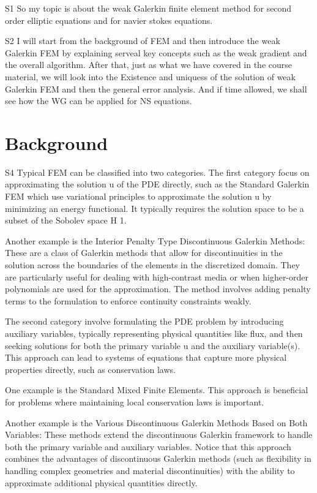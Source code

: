\documentclass[17pt]{extarticle} %
\begin{document}
\setlength{\parskip}{1em} 
\setlength{\parindent}{0pt}
S1
So my topic is about the weak Galerkin finite element method for second order elliptic
equations and for navier stokes equations.

S2
I will start from the background of FEM and then introduce the weak Galerkin FEM by explaining 
serveal key concepts such as the weak gradient and the overall algorithm. After that, just as what we have 
covered in the course material, we will look into the Existence and uniquess of the solution of weak
Galerkin FEM and then the general error analysis. And if time allowed, we shall see how the WG can be 
applied for NS equations.

\section*{Background}
S4
Typical FEM can be classified into two categories. The first category focus on approximating the 
solution u of the PDE directly, such as the Standard Galerkin FEM which 
use variational principles to approximate the solution u by minimizing an energy functional.
It typically requires the solution space to be a subset of the Sobolev space H 1.

Another example is the Interior Penalty Type Discontinuous Galerkin Methods: These are a class of Galerkin methods that allow 
for discontinuities in the solution across the boundaries of the elements in the discretized domain. 
They are particularly useful for dealing with high-contrast media or when higher-order polynomials 
are used for the approximation. The method involves adding penalty terms to the formulation to 
enforce continuity constraints weakly.

The second category involve formulating the PDE problem by introducing auxiliary variables, 
typically representing physical quantities like flux, and then seeking solutions for
both the primary variable u and the auxiliary variable(s). This approach can lead to 
systems of equations that capture more physical properties directly, such as conservation 
laws.

One example is the Standard Mixed Finite Elements. This approach 
is beneficial for problems where maintaining local conservation laws is important. 

Another example is the Various Discontinuous Galerkin Methods Based on Both Variables: These methods extend 
the discontinuous Galerkin framework to handle both the primary variable and auxiliary 
variables. Notice that this approach combines the advantages of discontinuous Galerkin 
methods (such as flexibility in handling complex geometries and material discontinuities) 
with the ability to approximate additional physical quantities directly. 
\end{document}
